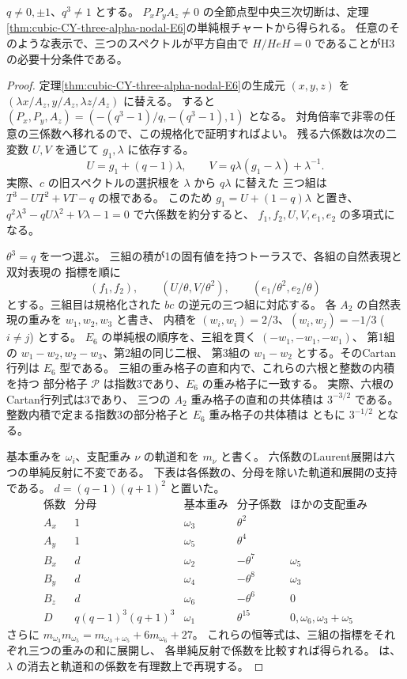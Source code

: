 \begin{theorem}[節点型の全係数の球面認識とH3判定]
\label{thm:cubic-CY-three-alpha-nodal-E6-surjective}
$q\ne0,\pm1$、$q^3\ne1$ とする。
$P_xP_yA_z\ne0$ の全節点型中央三次切断は、定理
\ref{thm:cubic-CY-three-alpha-nodal-E6}の単純根チャートから得られる。
任意のそのような表示で、三つのスペクトルが平方自由で
$H/HeH=0$ であることがH3の必要十分条件である。
\end{theorem}
\begin{proof}
定理\ref{thm:cubic-CY-three-alpha-nodal-E6}の生成元 $(x,y,z)$ を
$(\lambda x/A_z,y/A_z,\lambda z/A_z)$ に替える。
すると $(P_x,P_y,A_z)=(-(q^3-1)/q,-(q^3-1),1)$ となる。
対角倍率で非零の任意の三係数へ移れるので、この規格化で証明すればよい。
残る六係数は次の二変数 $U,V$ を通じて $g_1,\lambda$ に依存する。
\[
 U=g_1+(q-1)\lambda,\qquad V=q\lambda(g_1-\lambda)+\lambda^{-1}.
\]
実際、$c$ の旧スペクトルの選択根を $\lambda$ から $q\lambda$ に替えた
三つ組は $T^3-UT^2+VT-q$ の根である。
このため $g_1=U+(1-q)\lambda$ と置き、
$q^2\lambda^3-qU\lambda^2+V\lambda-1=0$ で六係数を約分すると、
$f_1,f_2,U,V,e_1,e_2$ の多項式になる。

$\theta^3=q$ を一つ選ぶ。
三組の積が1の固有値を持つトーラスで、各組の自然表現と双対表現の
指標を順に
\[
 (f_1,f_2),\qquad (U/\theta,V/\theta^2),\qquad
 (e_1/\theta^2,e_2/\theta)
\]
とする。三組目は規格化された $bc$ の逆元の三つ組に対応する。
各 $A_2$ の自然表現の重みを $w_1,w_2,w_3$ と書き、
内積を $(w_i,w_i)=2/3$、$(w_i,w_j)=-1/3$ ($i\ne j$) とする。
$E_6$ の単純根の順序を、三組を貫く $(-w_1,-w_1,-w_1)$、
第1組の $w_1-w_2,w_2-w_3$、第2組の同じ二根、
第3組の $w_1-w_2$ とする。そのCartan行列は $E_6$ 型である。
三組の重み格子の直和内で、これらの六根と整数の内積を持つ
部分格子 $\mathcal P$ は指数3であり、$E_6$ の重み格子に一致する。
実際、六根のCartan行列式は3であり、
三つの $A_2$ 重み格子の直和の共体積は $3^{-3/2}$ である。
整数内積で定まる指数3の部分格子と $E_6$ 重み格子の共体積は
ともに $3^{-1/2}$ となる。

基本重みを $\omega_i$、支配重み $\nu$ の軌道和を $m_\nu$ と書く。
六係数のLaurent展開は六つの単純反射に不変である。
下表は各係数の、分母を除いた軌道和展開の支持である。
$d=(q-1)(q+1)^2$ と置いた。
\[
\begin{array}{c|c|c|c|l}
\text{係数}&\text{分母}&\text{基本重み}&\text{分子係数}
 &\text{ほかの支配重み}\\ \hline
A_x&1&\omega_3&\theta^2&\\
A_y&1&\omega_5&\theta^4&\\
B_x&d&\omega_2&-\theta^7&\omega_5\\
B_y&d&\omega_4&-\theta^8&\omega_3\\
B_z&d&\omega_6&-\theta^6&0\\
D&q(q-1)^3(q+1)^3&\omega_1&\theta^{15}&0,\omega_6,\omega_3+\omega_5
\end{array}
\]
さらに $m_{\omega_3}m_{\omega_5}=m_{\omega_3+\omega_5}+6m_{\omega_6}+27$。
これらの恒等式は、三組の指標をそれぞれ三つの重みの和に展開し、
各単純反射で係数を比較すれば得られる。
は、$\lambda$ の消去と軌道和の係数を有理数上で再現する。


\end{proof}
